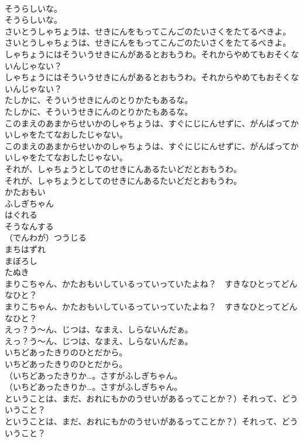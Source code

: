 \documentclass[8pt]{extreport}
\begin{document}
\begin{CJK}{UTF8}{min}
\\	そうらしいな。
\\	そうらしいな。
\\	さいとうしゃちょうは、せきにんをもってこんごのたいさくをたてるべきよ。
\\	さいとうしゃちょうは、せきにんをもってこんごのたいさくをたてるべきよ。
\\	しゃちょうにはそういうせきにんがあるとおもうわ。それからやめてもおそくないんじゃない？
\\	しゃちょうにはそういうせきにんがあるとおもうわ。それからやめてもおそくないんじゃない？
\\	たしかに、そういうせきにんのとりかたもあるな。
\\	たしかに、そういうせきにんのとりかたもあるな。
\\	このまえのあまからせいかのしゃちょうは、すぐにじにんせずに、がんばってかいしゃをたてなおしたじゃない。
\\	このまえのあまからせいかのしゃちょうは、すぐにじにんせずに、がんばってかいしゃをたてなおしたじゃない。
\\	それが、しゃちょうとしてのせきにんあるたいどだとおもうわ。
\\	それが、しゃちょうとしてのせきにんあるたいどだとおもうわ。
\\	かたおもい
\\	ふしぎちゃん
\\	はぐれる
\\	そうなんする
\\	（でんわが）つうじる
\\	まちはずれ
\\	まぼろし
\\	たぬき
\\	まりこちゃん、かたおもいしているっていっていたよね？　すきなひとってどんなひと？
\\	まりこちゃん、かたおもいしているっていっていたよね？　すきなひとってどんなひと？
\\	えっ？う～ん、じつは、なまえ、しらないんだぁ。
\\	えっ？う～ん、じつは、なまえ、しらないんだぁ。
\\	いちどあったきりのひとだから。
\\	いちどあったきりのひとだから。
\\	（いちどあったきりか…。さすがふしぎちゃん。
\\	（いちどあったきりか…。さすがふしぎちゃん。
\\	ということは、まだ、おれにもかのうせいがあるってことか？）それって、どういうこと？
\\	ということは、まだ、おれにもかのうせいがあるってことか？）それって、どういうこと？

\end{CJK}
\end{document}
